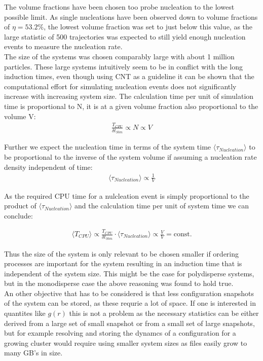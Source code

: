 The volume fractions have been chosen too probe nucleation to the lowest possible limit. As single nucleations have been observed down to volume fractions of $\eta=53.2\%$, the lowest volume fraction was set to just below this value, as the large statistic of 500 trajectories was expected to still yield enough nucleation events to measure the nucleation rate.\\

The size of the systems was chosen comparably large with about 1 million particles. These large systems intuitively seem to be in conflict with the long induction times, even though using CNT as a guideline it can be shown that the computational effort for simulating nucleation events does not significantly increase with increasing system size. The calculation time per unit of simulation time is proportional to N, it is at a given volume fraction also proportional to the volume V:
\begin{align}
\label{eqn:system_size}
\frac{T_{CPU}}{\delta t_{Sim}} \propto N \propto V 
\end{align}

Further we expect the nucleation time in terms of the system time $\langle \tau_{Nucleation} \rangle$ to be proportional to the inverse of the system volume if assuming a nucleation rate density independent of time:
\begin{align}
\langle \tau_{Nucleation} \rangle \propto \frac{1}{V}
\end{align}

As the required CPU time for a nulcleation event is simply proportional to the product of $\langle \tau_{Nucleation} \rangle$ and the calculation time per unit of system time we can conclude:

\begin{align}
\langle T_{CPU} \rangle \propto  \frac{T_{CPU}}{\delta t_{Sim}}  \cdot \langle \tau_{Nucleation} \rangle \propto \frac{V}{V} = \text{const.}
\end{align}

Thus the size of the system is only relevant to be chosen smaller if ordering processes are important for the system resulting in an induction time that is independent of the system size. This might be the case for polydisperse systems, but in the monodisperse case the above reasoning was found to hold true.\\
An other objective that has to be considered is that less configuration snapshots of the system can be stored, as these requrie a lot of space. If one is interested in quantites like $g(r)$ this is not a problem as the necessary statistics can be either derived from a large set of small snapshot or from a small set of large snapshots, but for example resolving and storing the dynamcs of a configuration for a growing cluster would require using smaller system sizes as files easily grow to many GB's in size. 

